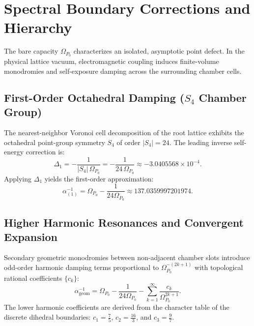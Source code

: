 \documentclass[11pt,a4paper]{article}
\begin{document}
\section{Spectral Boundary Corrections and Hierarchy}\label{sec:corrections}
The bare capacity $\Omega_{P_0}$ characterizes an isolated, asymptotic point defect. In the physical lattice vacuum, electromagnetic coupling induces finite-volume monodromies and self-exposure damping across the surrounding chamber cells.

\subsection{First-Order Octahedral Damping (\texorpdfstring{$S_4$}{S4} Chamber Group)}
The nearest-neighbor Voronoi cell decomposition of the root lattice exhibits the octahedral point-group symmetry $S_4$ of order $|S_4| = 24$. The leading inverse self-energy correction is:
\begin{equation}
\Delta_1 = -\frac{1}{|S_4|\,\Omega_{P_0}} = -\frac{1}{24\,\Omega_{P_0}} \approx -3.0405568 \times 10^{-4}.
\end{equation}
Applying $\Delta_1$ yields the first-order approximation:
\begin{equation}
\alpha_{(1)}^{-1} = \Omega_{P_0} - \frac{1}{24\Omega_{P_0}} \approx 137.0359997201974.
\end{equation}

\subsection{Higher Harmonic Resonances and Convergent Expansion}
Secondary geometric monodromies between non-adjacent chamber slots introduce odd-order harmonic damping terms proportional to $\Omega_{P_0}^{-(2k+1)}$ with topological rational coefficients $\{c_k\}$:
\begin{equation}
\alpha_{\text{geom}}^{-1} = \Omega_{P_0} - \frac{1}{24\Omega_{P_0}} - \sum_{k=1}^{\infty} \frac{c_k}{\Omega_{P_0}^{2k+1}}.
\end{equation}
The lower harmonic coefficients are derived from the character table of the discrete dihedral boundaries: $c_1 = \frac{7}{5}$, $c_2 = \frac{16}{3}$, and $c_3 = \frac{9}{7}$.
\end{document}
